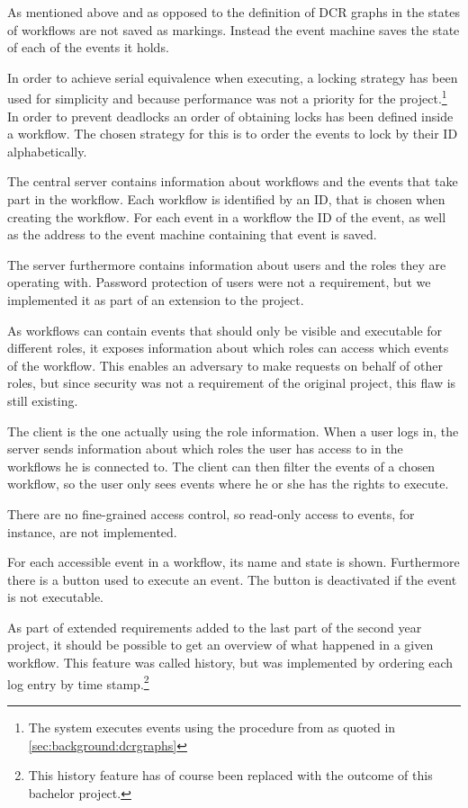 		As mentioned above and as opposed to the definition of DCR graphs in \cite{hildebrandt2011declarative} the states of workflows are not saved as markings. Instead the event machine saves the state of each of the events it holds.
		
		\newpar In order to achieve serial equivalence when executing, a locking strategy has been used for simplicity and because performance was not a priority for the project.\footnote{The system executes events using the procedure from \cite{debois2015concurrency} as quoted in \autoref{sec:background:dcrgraphs}} In order to prevent deadlocks an order of obtaining locks has been defined inside a workflow. The chosen strategy for this is to order the events to lock by their ID alphabetically.
		
		\newpar The central server contains information about workflows and the events that take part in the workflow. Each workflow is identified by an ID, that is chosen when creating the workflow. For each event in a workflow the ID of the event, as well as the address to the event machine containing that event is saved.
		
		\newpar The server furthermore contains information about users and the roles they are operating with. Password protection of users were not a requirement, but we implemented it as part of an extension to the project.
		
		\newpar As workflows can contain events that should only be visible and executable for different roles, it exposes information about which roles can access which events of the workflow. This enables an adversary to make requests on behalf of other roles, but since security was not a requirement of the original project, this flaw is still existing.
		
		\newpar The client is the one actually using the role information. When a user logs in, the server sends information about which roles the user has access to in the workflows he is connected to. The client can then filter the events of a chosen workflow, so the user only sees events where he or she has the rights to execute.
		
		There are no fine-grained access control, so read-only access to events, for instance, are not implemented.
		
		\newpar For each accessible event in a workflow, its name and state is shown. Furthermore there is a button used to execute an event. The button is deactivated if the event is not executable.
		
		\newpar As part of extended requirements added to the last part of the second year project, it should be possible to get an overview of what happened in a given workflow. This feature was called history, but was implemented by ordering each log entry by time stamp.\footnote{This history feature has of course been replaced with the outcome of this bachelor project.}
		
